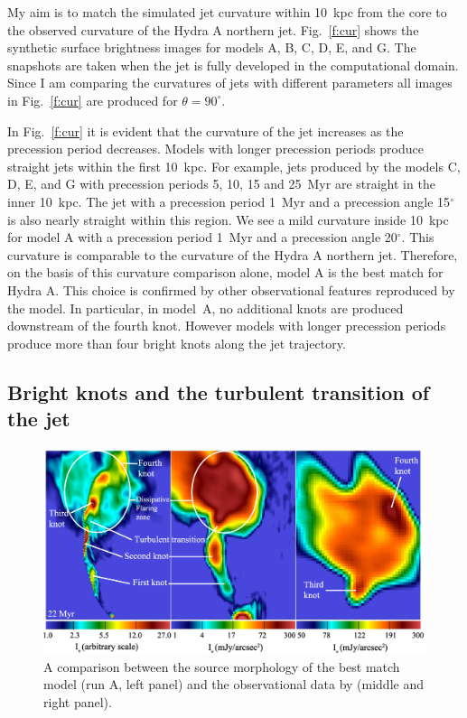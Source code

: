 My aim is to match the simulated jet curvature within 10~kpc from the core to the observed curvature of  the Hydra A northern jet. Fig.~\ref{f:cur} shows the synthetic surface brightness images for models A, B, C, D, E, and G. The snapshots are taken when the jet is fully developed in the computational domain.
Since I am comparing the curvatures of jets with different parameters all images in Fig.~\ref{f:cur} are produced for $\theta = 90^{\circ}$.

In Fig.~\ref{f:cur} it is evident that the curvature of the jet increases as the precession period decreases. Models with longer precession periods produce straight jets within the first 10~kpc. For example, jets produced by the models C, D, E, and G with precession periods 5, 10, 15 and 25~Myr are straight in the inner 10~kpc. The jet with a precession period 1~Myr and a precession angle 15$^{\circ}$ is also nearly straight within this region. We see a mild curvature inside 10~kpc for model A with a precession period 1~Myr and a precession angle 20$^{\circ}$. This curvature is comparable to the curvature of the Hydra A northern jet. Therefore, on the basis of this curvature comparison alone, model A is the best match for Hydra A. This choice is confirmed by other observational features reproduced by the model. In particular, in model~A, no additional knots are produced downstream of the fourth knot. However models with longer precession periods produce more than four bright knots along the jet trajectory. 

\subsection{Bright knots and the turbulent transition of the jet}
\begin{figure}
\centering
\includegraphics[width=\textwidth]{fig5.eps}
\caption{ A comparison between the source morphology of the best match model (run A, left panel) and the observational data by \citet{taylor90} (middle and right panel).}
\label{f:hyd}
\end{figure}

